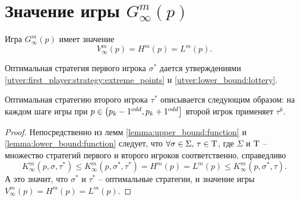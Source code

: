 \section{Значение игры $ G_\infty^m(p) $}
\begin{theorem}
\label{theorem:infinite_game:value}
Игра $ G_\infty^m(p) $ имеет значение 
\[
V_\infty^m(p) = H^m(p) = L^m(p).
\]

Оптимальная стратегия первого игрока $ \sigma^* $ дается утверждениями \ref{utver:first_player:strategy:extreme_points} и \ref{utver:lower_bound:lottery}.

Оптимальная стратегию второго игрока $ \tau^* $ описывается следующим образом: на каждом шаге игры при $ p \in \left( p_k-1^{odd}, p_k+1^{odd} \right] $ второй игрок применяет $ \tau^k $.
\end{theorem}
\begin{proof}
Непосредственно из лемм \ref{lemma:upper_bound:function} и \ref{lemma:lower_bound:function} следует, что
$ \forall \sigma \in \Sigma, \, \tau \in \mathrm{T} $, где $ \Sigma $ и $ \mathrm{T} $ -- множество стратегий первого и второго игроков соответственно, справедливо
\[
  K_\infty^m(p, \sigma, \tau^*)
\leq K_\infty^m(p, \sigma^*, \tau^*) = H^m(p) = L^m(p) \leq 
  K_\infty^m(p, \sigma^*, \tau).
\]
А это значит, что $ \sigma^* $ и $ \tau^* $ -- оптимальные стратегии, и значение игры $ V_\infty^m(p) = H^m(p) = L^m(p) $.
\end{proof}